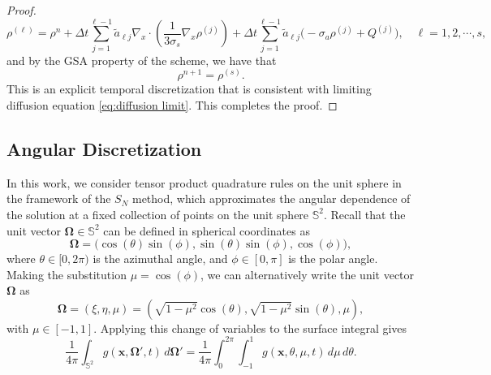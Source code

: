 \documentclass[onefignum,onetabnum]{siamart220329}
\begin{document}
\begin{proof}
    \begin{equation*}
        \rho^{(\ell)} = \rho^{n}  + \Delta t \sum_{j=1}^{\ell-1} \widetilde{a}_{\ell j} \nabla_{x} \cdot \left( \frac{1}{3 \sigma_{s}} \nabla_{x}  \rho^{(j)} \right) + \Delta t \sum_{j=1}^{\ell-1} \widetilde{a}_{\ell j} \Big(- \sigma_{a} \rho^{(j)} + Q^{(j)} \Big), \quad \ell = 1,2,\cdots,s,
    \end{equation*}
    and by the GSA property of the scheme, we have that $$\rho^{n+1} = \rho^{(s)}.$$ This is an explicit temporal discretization that is consistent with limiting diffusion equation \eqref{eq:diffusion limit}. This completes the proof.
\end{proof}





\subsection{Angular Discretization}
\label{subsec:SN discretization}

In this work, we consider tensor product quadrature rules on the unit sphere in the framework of the $S_{N}$ method, which approximates the angular dependence of the solution at a fixed collection of points on the unit sphere $\mathbb{S}^{2}$. Recall that the unit vector $\mathbf{\Omega} \in \mathbb{S}^{2}$ can be defined in spherical coordinates as
\begin{equation*}
    \mathbf{\Omega} = \Big( \cos (\theta) \sin (\phi), \sin (\theta) \sin (\phi), \cos (\phi) \Big),
\end{equation*}
where $\theta \in [0, 2\pi)$ is the azimuthal angle, and $\phi \in [0, \pi]$ is the polar angle. Making the substitution $\mu = \cos (\phi)$, we can alternatively write the unit vector $\mathbf{\Omega}$ as
\begin{equation}
    \label{eq:S2 parameterization}
    \mathbf{\Omega} = \left(\xi, \eta, \mu \right) = \left( \sqrt{1 - \mu^2} \cos (\theta), \sqrt{1 - \mu^2} \sin (\theta), \mu \right),
\end{equation}
with $\mu \in [-1,1]$. Applying this change of variables to the surface integral gives
\begin{equation}
    \label{eq:angular integral change of variable}
    \frac{1}{4\pi} \int_{\mathbb{S}^{2}}  g (\mathbf{x}, \mathbf{\Omega}',t) \,d\mathbf{\Omega}' = \frac{1}{4\pi} \int_{0}^{2\pi} \int_{-1}^{1}  g (\mathbf{x}, \theta, \mu, t) \,d\mu \,d\theta.
\end{equation}
\end{document}
